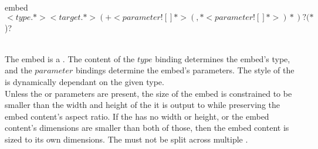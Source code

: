 \begin{identifier}{embed}
\[ <type .*> <target .*>( +<parameter ![ ]*>(, *<parameter ![ ]*>)*)?( *\])?
\end{identifier}
 \\

The embed is a . The content of the \inline$type$ binding determines the embed's type, and the \inline$parameter$ bindings determine the embed's parameters. The style of the  is dynamically dependant on the given type. \\

Unless the  or  parameters are present, the size of the embed  is constrained to be smaller than the width and height of the  it is output to while preserving the embed content's aspect ratio. If the  has no width or height, or the embed content's dimensions are smaller than both of those, then the embed content is sized to its own dimensions. The  must not be split across multiple .\\




